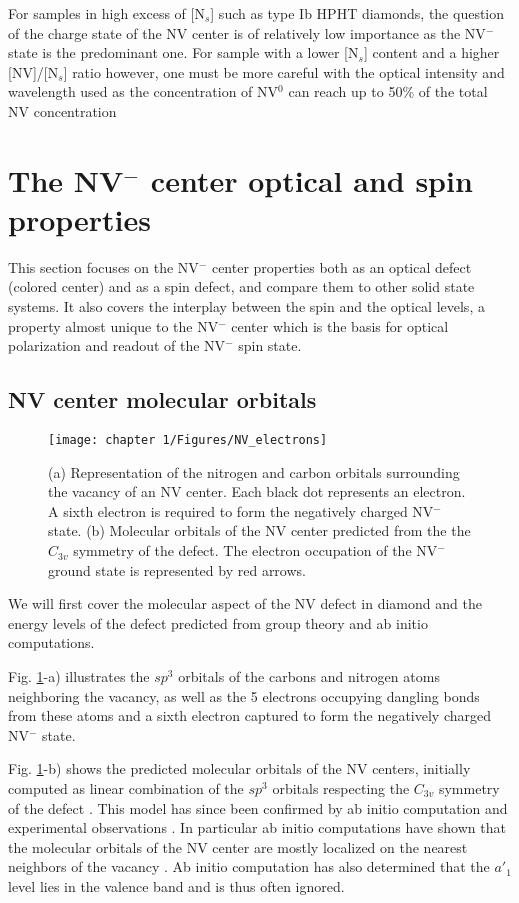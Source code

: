 \documentclass[a4paper,11pt]{report}
\begin{document}
\begin{refsection}
For samples in high excess of [N$_s$] such as type Ib HPHT diamonds, the question of the charge state of the NV center is of relatively low importance as the NV$^-$ state is the predominant one. For sample with a lower [N$_s$] content and a higher [NV]/[N$_s$] ratio however, one must be more careful with the optical intensity and wavelength used as the concentration of NV$^0$ can reach up to 50\% of the total NV concentration \citep{grezes2015storage}

\section{The NV$^-$ center optical and spin properties}

This section focuses on the NV$^-$ center properties both as an optical defect (colored center) and as a spin defect, and compare them to other solid state systems. It also covers the interplay between the spin and the optical levels, a property almost unique to the NV$^-$ center which is the basis for optical polarization and readout of the NV$^-$ spin state.

\subsection{NV center molecular orbitals}

\begin{figure}[h!]
\centering
\texttt{[image: chapter 1/Figures/NV\_electrons]}
\caption{(a) Representation of the nitrogen and carbon orbitals surrounding the vacancy of an NV center. Each black dot represents an electron. A sixth electron is required to form the negatively charged NV$^-$ state. (b) Molecular orbitals of the NV center predicted from the the $C_{3v}$ symmetry of the defect. The electron occupation of the NV$^-$ ground state is represented by red arrows.}
\label{NV electrons}
\end{figure}

We will first cover the molecular aspect of the NV defect in diamond and the energy levels of the defect predicted from group theory and ab initio computations.

Fig. \ref{NV electrons}-a) illustrates the $sp^3$ orbitals of the carbons and nitrogen atoms neighboring the vacancy, as well as the 5 electrons occupying dangling bonds from these atoms and a sixth electron captured to form the negatively charged NV$^-$ state. 

Fig. \ref{NV electrons}-b) shows the predicted molecular orbitals of the NV centers, initially computed as linear combination of the $sp^3$ orbitals respecting the $C_{3v}$ symmetry of the defect \citep{loubser1978electron}. This model has since been confirmed by ab initio computation and experimental observations \citep{doherty2013nitrogen}. In particular ab initio computations have shown that the molecular orbitals of the NV center are mostly localized on the nearest neighbors of the vacancy \citep{gali2008ab}. Ab initio computation has also determined that the $a'_1$ level lies in the valence band and is thus often ignored.


\end{refsection}
\end{document}
